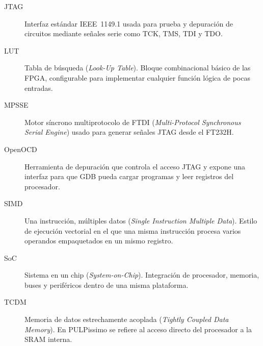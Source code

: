 \begin{description}
  \item[JTAG] Interfaz estándar IEEE~1149.1 usada para prueba y depuración de
        circuitos mediante señales serie como TCK, TMS, TDI y TDO.

  \item[LUT] Tabla de búsqueda (\textit{Look-Up Table}). Bloque combinacional
        básico de las FPGA, configurable para implementar cualquier función
        lógica de pocas entradas.

  \item[MPSSE] Motor síncrono multiprotocolo de FTDI
        (\textit{Multi-Protocol Synchronous Serial Engine}) usado para generar
        señales JTAG desde el FT232H.

  \item[OpenOCD] Herramienta de depuración que controla el acceso JTAG y expone
        una interfaz para que GDB pueda cargar programas y leer registros del
        procesador.

  \item[SIMD] Una instrucción, múltiples datos
        (\textit{Single Instruction Multiple Data}). Estilo de ejecución
        vectorial en el que una misma instrucción procesa varios operandos
        empaquetados en un mismo registro.

  \item[SoC] Sistema en un chip (\textit{System-on-Chip}). Integración de
        procesador, memoria, buses y periféricos dentro de una misma plataforma.

  \item[TCDM] Memoria de datos estrechamente acoplada
        (\textit{Tightly Coupled Data Memory}). En PULPissimo se refiere al acceso
        directo del procesador a la SRAM interna.
\end{description}

\cleardoublepage

